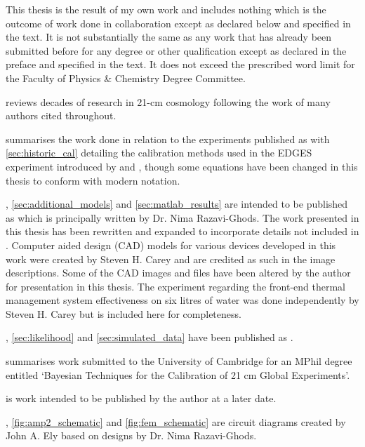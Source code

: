 
\begin{declaration}

This thesis is the result of my own work and includes nothing which is the outcome of work done in collaboration except as declared below and specified in the text. It is not substantially the same as any work that has already been submitted before for any degree or other qualification except as declared in the preface and specified in the text. It does not exceed the prescribed word limit for the Faculty of Physics \& Chemistry Degree Committee.

 reviews decades of research in 21-cm cosmology following the work of many authors cited throughout.

 summarises the work done in relation to the experiments published as \citet{edgesNature} with \cref{sec:historic_cal} detailing the calibration methods used in the EDGES experiment introduced by \citet{rogersCal} and \citet{edgesCal}, though some equations have been changed in this thesis to conform with modern notation.

, \cref{sec:additional_models} and \cref{sec:matlab_results} are intended to be published as \citet{nimaCal} which is principally written by Dr. Nima Razavi-Ghods. The work presented in this thesis has been rewritten and expanded to incorporate details not included in \citet{nimaCal}. Computer aided design (CAD) models for various devices developed in this work were created by Steven H. Carey and are credited as such in the image descriptions. Some of the CAD images and files have been altered by the author for presentation in this thesis. The experiment regarding the front-end thermal management system effectiveness on six litres of water was done independently by Steven H. Carey but is included here for completeness. 

, \cref{sec:likelihood} and \cref{sec:simulated_data} have been published as \citet{ian_bayes}.

 summarises work submitted to the University of Cambridge for an MPhil degree entitled ‘Bayesian Techniques for the Calibration of 21 cm Global Experiments’.

 is work intended to be published by the author at a later date.

, \cref{fig:amp2_schematic} and \cref{fig:fem_schematic} are circuit diagrams created by John A. Ely based on designs by Dr. Nima Razavi-Ghods.

\end{declaration}
